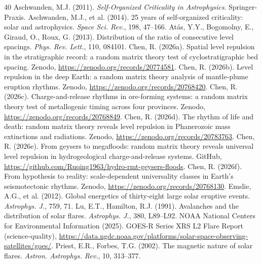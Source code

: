 \documentclass[12pt,a4paper]{article}
\begin{document}
\begin{thebibliography}{40}
 Aschwanden, M.J. (2011). \textit{Self-Organized Criticality in Astrophysics}. Springer-Praxis.
 Aschwanden, M.J., et al. (2014). 25 years of self-organized criticality: solar and astrophysics. \textit{Space Sci. Rev.}, 198, 47--166.
 At\'as, Y.Y., Bogomolny, E., Giraud, O., Roux, G. (2013). Distribution of the ratio of consecutive level spacings. \textit{Phys. Rev. Lett.}, 110, 084101.
 Chen, R. (2026a). Spatial level repulsion in the stratigraphic record: a random matrix theory test of cyclostratigraphic bed spacing. Zenodo, \url{https://zenodo.org/records/20774581}.
 Chen, R. (2026b). Level repulsion in the deep Earth: a random matrix theory analysis of mantle-plume eruption rhythms. Zenodo, \url{https://zenodo.org/records/20768420}.
 Chen, R. (2026c). Charge-and-release rhythms in ore-forming systems: a random matrix theory test of metallogenic timing across four provinces. Zenodo, \url{https://zenodo.org/records/20768849}.
 Chen, R. (2026d). The rhythm of life and death: random matrix theory reveals level repulsion in Phanerozoic mass extinctions and radiations. Zenodo, \url{https://zenodo.org/records/20783763}.
 Chen, R. (2026e). From geysers to megafloods: random matrix theory reveals universal level repulsion in hydrogeological charge-and-release systems. GitHub, \url{https://github.com/Ruqing1963/hydro-rmt-geysers-floods}.
 Chen, R. (2026f). From hypothesis to reality: scale-dependent universality classes in Earth's seismotectonic rhythms. Zenodo, \url{https://zenodo.org/records/20768130}.
 Emslie, A.G., et al. (2012). Global energetics of thirty-eight large solar eruptive events. \textit{Astrophys. J.}, 759, 71.
 Lu, E.T., Hamilton, R.J. (1991). Avalanches and the distribution of solar flares. \textit{Astrophys. J.}, 380, L89--L92.
 NOAA National Centers for Environmental Information (2025). GOES-R Series XRS L2 Flare Report (science-quality), \url{https://data.ngdc.noaa.gov/platforms/solar-space-observing-satellites/goes/}.
 Priest, E.R., Forbes, T.G. (2002). The magnetic nature of solar flares. \textit{Astron. Astrophys. Rev.}, 10, 313--377.

\end{thebibliography}
\end{document}
